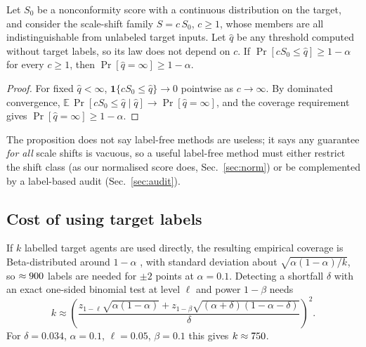 \begin{proposition}\label{prop:ident}
Let $S_0$ be a nonconformity score with a continuous distribution on the target, and consider the scale-shift family
$S=c\,S_0$, $c\ge1$, whose members are all indistinguishable from unlabeled target inputs. Let $\hat q$ be any threshold
computed without target labels, so its law does not depend on $c$. If $\Pr[cS_0\le\hat q]\ge 1-\alpha$ for every $c\ge1$,
then $\Pr[\hat q=\infty]\ge 1-\alpha$.
\end{proposition}
\begin{proof}
For fixed $\hat q<\infty$, $\mathbf{1}\{cS_0\le\hat q\}\to 0$ pointwise as $c\to\infty$. By dominated convergence,
$\mathbb{E}\,\Pr[cS_0\le\hat q\mid \hat q]\to \Pr[\hat q=\infty]$, and the coverage requirement gives
$\Pr[\hat q=\infty]\ge 1-\alpha$.
\end{proof}
\begin{remark}
The proposition does not say label-free methods are useless; it says any guarantee \emph{for all} scale shifts is vacuous,
so a useful label-free method must either restrict the shift class (as our normalised score does, Sec.~\ref{sec:norm}) or
be complemented by a label-based audit (Sec.~\ref{sec:audit}).
\end{remark}

\subsection{Cost of using target labels}
If $k$ labelled target agents are used directly, the resulting empirical coverage is Beta-distributed around
$1-\alpha$ \cite{vovk2012conditional}, with standard deviation about $\sqrt{\alpha(1-\alpha)/k}$, so $\approx900$
labels are needed for $\pm 2$ points at $\alpha=0.1$.
Detecting a shortfall $\delta$ with an exact one-sided binomial test at level $\ell$ and power $1-\beta$ needs
\begin{equation}\label{eq:budget}
k\approx\left(\frac{z_{1-\ell}\sqrt{\alpha(1-\alpha)}+z_{1-\beta}\sqrt{(\alpha+\delta)(1-\alpha-\delta)}}{\delta}\right)^{2}.
\end{equation}
For $\delta=0.034$, $\alpha=0.1$, $\ell=0.05$, $\beta=0.1$ this gives $k\approx750$.
